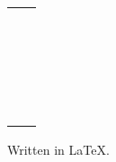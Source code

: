 {\large


 \vspace{-3.4cm}

{ \hspace{2.6cm} \bfseries \fontsize{1.6cm}{1.6em}\selectfont \textcolor{white}{ %
}} \\

\bigskip
\vspace{3cm}


{ \hspace{-1cm} \bfseries {\fontsize{2.2cm}{2.2em}\selectfont  \textcolor{ocre}{\titulo}} \\
}


{ \hspace{0.5cm} \bfseries {\fontsize{1.5cm}{1.5em}\selectfont  \textcolor{ocre}{\subtitulo}} \\
}



\vspace{10.1cm}

\hspace{2cm} \begin{tabular} {cc}

&
\hspace{-4.6cm}\parbox{0.7\textwidth}{{\textbf{ \large}}

					{\color{ocre}\Large \bfseries

				\universidade \\
					\lugar\\
					\versao \\
					\data\\
					 }}
			\end{tabular}}

%
						 \textcolor{myblueii}{Written in \LaTeX{}.}




\vfill

\pagecolor{white}
